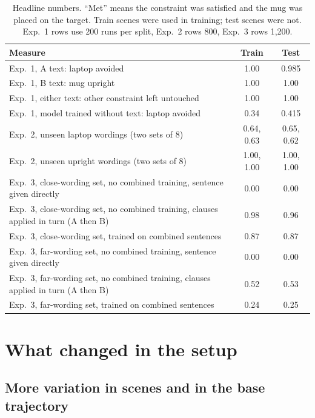 \documentclass[11pt]{article}
\begin{document}
\begin{table}[h]
\centering\small
\caption{Headline numbers. ``Met'' means the constraint was satisfied and the mug was placed on the
target. Train scenes were used in training; test scenes were not. Exp.~1 rows use 200 runs per split,
Exp.~2 rows 800, Exp.~3 rows 1{,}200.}
\label{tab:summary}
\begin{tabularx}{\linewidth}{@{}Ycc@{}}
\toprule
Measure & Train & Test \\
\midrule
Exp.~1, A text: laptop avoided & 1.00 & 0.985 \\
Exp.~1, B text: mug upright & 1.00 & 1.00 \\
Exp.~1, either text: other constraint left untouched & 1.00 & 1.00 \\
Exp.~1, model trained without text: laptop avoided & 0.34 & 0.415 \\
Exp.~2, unseen laptop wordings (two sets of 8) & 0.64, 0.63 & 0.65, 0.62 \\
Exp.~2, unseen upright wordings (two sets of 8) & 1.00, 1.00 & 1.00, 1.00 \\
\midrule
Exp.~3, close-wording set, no combined training, sentence given directly & 0.00 & 0.00 \\
Exp.~3, close-wording set, no combined training, clauses applied in turn (A then B) & 0.98 & 0.96 \\
Exp.~3, close-wording set, trained on combined sentences & 0.87 & 0.87 \\
Exp.~3, far-wording set, no combined training, sentence given directly & 0.00 & 0.00 \\
Exp.~3, far-wording set, no combined training, clauses applied in turn (A then B) & 0.52 & 0.53 \\
Exp.~3, far-wording set, trained on combined sentences & 0.24 & 0.25 \\
\bottomrule
\end{tabularx}
\end{table}

\section{What changed in the setup}
\label{sec:setup}

\subsection{More variation in scenes and in the base trajectory}
\end{document}
